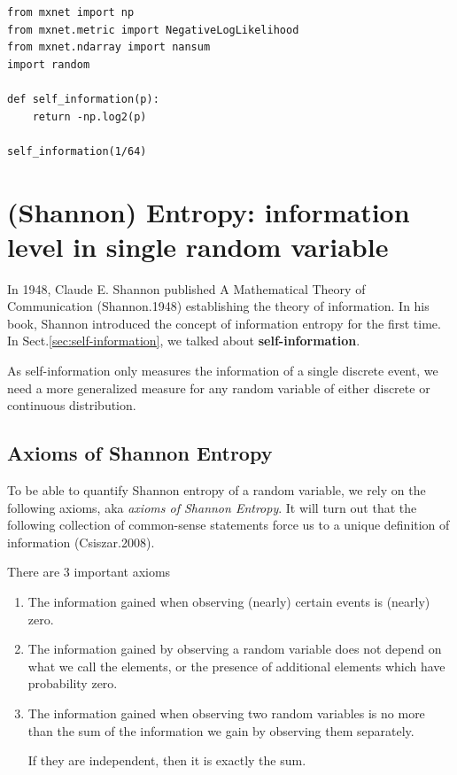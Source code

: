 \begin{lstlisting}
from mxnet import np
from mxnet.metric import NegativeLogLikelihood
from mxnet.ndarray import nansum
import random

def self_information(p):
    return -np.log2(p)

self_information(1/64)
\end{lstlisting}

\section{(Shannon) Entropy: information level in single random variable}

In 1948, Claude E. Shannon published A Mathematical Theory of Communication
(Shannon.1948) establishing the theory of information. In his book, Shannon
introduced the concept of information entropy for the first time. 
In Sect.\ref{sec:self-information}, we talked about {\bf self-information}.

As self-information only measures the information of a single discrete event, we
need a more generalized measure for any random variable of either discrete or
continuous distribution.

\subsection{Axioms of Shannon Entropy}
\label{sec:Shannon-entropy}

To be able to quantify Shannon entropy of a random variable, we rely on the
following axioms, aka {\it axioms of Shannon Entropy}.
It will turn out that the following collection of common-sense statements force
us to a unique definition of information (Csiszar.2008).

There are 3 important axioms
\begin{enumerate}
\item The information gained when observing (nearly) certain events is (nearly) zero.

\item  The information gained by observing a random variable does not depend on what
  we call the elements, or the presence of additional elements which have
  probability zero.

\item The information gained when observing two random variables is no more than
the sum of the information we gain by observing them separately. 

If they are independent, then it is exactly the sum.

\end{enumerate}

